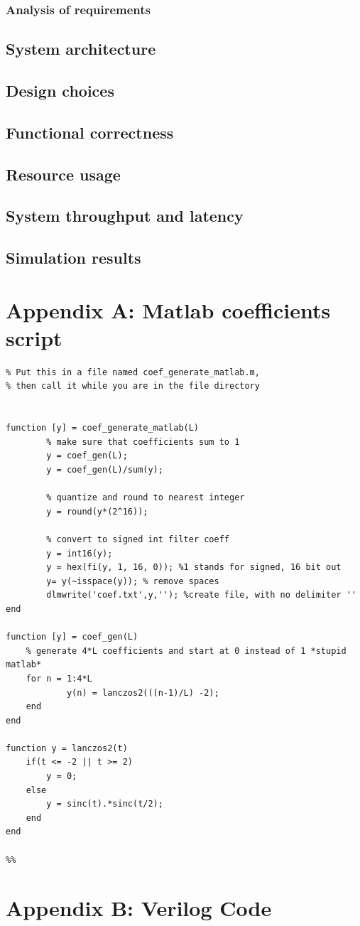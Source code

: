 \documentclass[a4paper,twoside,11pt, fleqn]{article}
\begin{document}
\subsubsection{Analysis of requirements}

\subsection{System architecture}

\subsection{Design choices}

\subsection{Functional correctness}

\subsection{Resource usage}

\subsection{System throughput and latency}

\subsection{Simulation results}

\newpage
\section{Appendix A: Matlab coefficients script}
\begin{lstlisting}
% Put this in a file named coef_generate_matlab.m, 
% then call it while you are in the file directory


function [y] = coef_generate_matlab(L)
        % make sure that coefficients sum to 1
        y = coef_gen(L);
        y = coef_gen(L)/sum(y);

        % quantize and round to nearest integer
        y = round(y*(2^16)); 
             
        % convert to signed int filter coeff
        y = int16(y);
        y = hex(fi(y, 1, 16, 0)); %1 stands for signed, 16 bit out
        y= y(~isspace(y)); % remove spaces
        dlmwrite('coef.txt',y,''); %create file, with no delimiter ''      
end

function [y] = coef_gen(L)
    % generate 4*L coefficients and start at 0 instead of 1 *stupid matlab*
    for n = 1:4*L
            y(n) = lanczos2(((n-1)/L) -2);
    end
end

function y = lanczos2(t)
    if(t <= -2 || t >= 2)
        y = 0;
    else
        y = sinc(t).*sinc(t/2);
    end
end

%%
\end{lstlisting}

\newpage
\section{Appendix B: Verilog Code}
\end{document}

